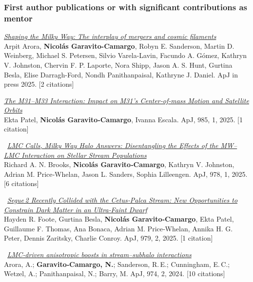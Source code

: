 \documentclass[14pt]{article}
\begin{document}
\subsubsection*{First author publications or with significant contributions as mentor}


\begin{etaremune}
  \setcounter{enumi}{34}
\item \dag
  \textit{\href{https://ui.adsabs.harvard.edu/abs/2025arXiv250420133A/abstract}{Shaping the Milky Way: The interplay of mergers and cosmic
  filaments}}\\
  { \small \color{darkgray} Arpit Arora, \textbf{Nicol\'as
  Garavito-Camargo},  Robyn E. Sanderson, Martin D. Weinberg, Michael S.
  Petersen, Silvio Varela-Lavin, Facundo A. Gómez, Kathryn V. Johnston, Chervin
  F. P. Laporte, Nora Shipp, Jason A. S. Hunt, Gurtina Besla, Elise
Darragh-Ford, Nondh Panithanpaisal, Kathryne J. Daniel. ApJ in press 2025.
[2 citations]}

\item \textit{\href{https://ui.adsabs.harvard.edu/abs/2025ApJ...985..121P/abstract}{The M31–M33 Interaction: Impact on M31's Center‑of‑mass Motion and Satellite Orbits}}\\
{ \small \color{darkgray} Ekta Patel, \textbf{Nicol\'as Garavito‑Camargo}, Ivanna Escala. ApJ, 985, 1, 2025. [1 citation]}

\item \dag\ \textit{\href{https://ui.adsabs.harvard.edu/abs/2025ApJ...978...79B/abstract}{LMC Calls, Milky Way Halo Answers: Disentangling the Effects of the MW–LMC Interaction on Stellar Stream Populations}}\\
{ \small \color{darkgray} Richard A. N. Brooks, \textbf{Nicol\'as Garavito‑Camargo}, Kathryn V. Johnston, Adrian M. Price‑Whelan, Jason L. Sanders, Sophia Lilleengen. ApJ, 978, 1, 2025. [6 citations]}

\item \ddag\ \textit{\href{https://ui.adsabs.harvard.edu/abs/2025ApJ...979..171F/abstract}{Segue 2 Recently Collided with the Cetus‑Palca Stream: New Opportunities to Constrain Dark Matter in an Ultra‑Faint Dwarf}}\\
{ \small \color{darkgray} Hayden R. Foote, Gurtina Besla, \textbf{Nicol\'as Garavito‑Camargo}, Ekta Patel, Guillaume F. Thomas, Ana Bonaca, Adrian M. Price‑Whelan, Annika H. G. Peter, Dennis Zaritsky, Charlie Conroy. ApJ, 979, 2, 2025. [1 citation]}

\item \dag\ \textit{\href{https://ui.adsabs.harvard.edu/abs/2024ApJ...974..286A/abstract}{LMC‑driven anisotropic boosts in stream–subhalo interactions}}\\
{ \small \color{darkgray} Arora, A.; \textbf{Garavito‑Camargo, N.}; Sanderson, R. E.; Cunningham, E. C.; Wetzel, A.; Panithanpaisal, N.; Barry, M. ApJ, 974, 2, 2024. [10 citations]}


\end{etaremune}
\end{document}
